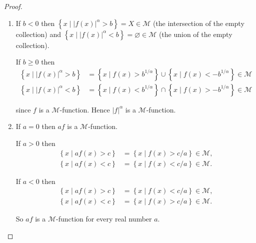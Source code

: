 \begin{proof}
	\begin{enumerate}[label={(\arabic*)}]
		\item If \( b < 0 \) then \( \left\{ x \mid {\left\vert f(x) \right\vert}^{\alpha} > b \right\} = X \in \mathscr{M} \) (the intersection of the empty collection) and \( \left\{ x \mid {\left\vert f(x) \right\vert}^{\alpha} < b \right\} = \varnothing \in \mathscr{M} \) (the union of the empty collection).

		      If \( b \ge 0 \) then
		      \begingroup
		      \allowdisplaybreaks%
		      \begin{align*}
			      \left\{ x \mid {\left\vert f(x) \right\vert}^{\alpha} > b \right\} & = \left\{ x \mid f(x) > b^{1/\alpha} \right\} \cup \left\{ x \mid f(x) < -b^{1/\alpha} \right\} \in \mathscr{M} \\
			      \left\{ x \mid {\left\vert f(x) \right\vert}^{\alpha} < b \right\} & = \left\{ x \mid f(x) < b^{1/\alpha} \right\} \cap \left\{ x \mid f(x) > -b^{1/\alpha} \right\} \in \mathscr{M}
		      \end{align*}
		      \endgroup

		      since \( f \) is a \( \mathscr{M} \)-function. Hence \( {\left\vert f \right\vert}^{\alpha} \) is a \( \mathscr{M} \)-function.
		\item If \( a = 0 \) then \( af \) is a \( \mathscr{M} \)-function.

		      If \( a > 0 \) then
		      \begingroup
		      \allowdisplaybreaks%
		      \begin{align*}
			      \left\{ x \mid af(x) > c \right\} & = \left\{ x \mid f(x) > c/a \right\} \in \mathscr{M}, \\
			      \left\{ x \mid af(x) < c \right\} & = \left\{ x \mid f(x) < c/a \right\} \in \mathscr{M}.
		      \end{align*}
		      \endgroup

		      If \( a < 0 \) then
		      \begingroup
		      \allowdisplaybreaks%
		      \begin{align*}
			      \left\{ x \mid af(x) > c \right\} & = \left\{ x \mid f(x) < c/a \right\} \in \mathscr{M}, \\
			      \left\{ x \mid af(x) < c \right\} & = \left\{ x \mid f(x) > c/a \right\} \in \mathscr{M}.
		      \end{align*}
		      \endgroup

		      So \( af \) is a \( \mathscr{M} \)-function for every real number \( a \).


\end{enumerate}
\end{proof}
